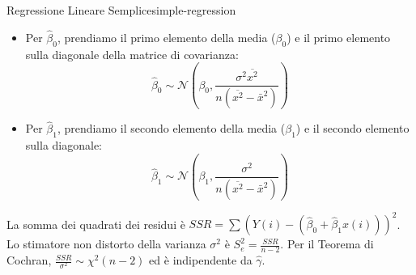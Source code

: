 \begin{esempio}{Regressione Lineare Semplice}{simple-regression}
\begin{itemize}
    \item Per $\hat{\beta}_0$, prendiamo il primo elemento della media ($\beta_0$) e il primo elemento sulla diagonale della matrice di covarianza:
    \[
    \hat{\beta}_0 \sim \mathcal{N}\left(\beta_0, \frac{\sigma^2\overline{x^2}}{n(\overline{x^2}-\bar{x}^2)}\right)
    \]
    \item Per $\hat{\beta}_1$, prendiamo il secondo elemento della media ($\beta_1$) e il secondo elemento sulla diagonale:
    \[
    \hat{\beta}_1 \sim \mathcal{N}\left(\beta_1, \frac{\sigma^2}{n(\overline{x^2}-\bar{x}^2)}\right)
    \]
\end{itemize}
La somma dei quadrati dei residui è $SSR = \sum(Y(i) - (\hat{\beta}_0 +
\hat{\beta}_1 x(i)))^2$. Lo stimatore non distorto della varianza $\sigma^2$ è
$S_e^2 = \frac{SSR}{n-2}$\label{eq:se-lin-regr}. Per il Teorema di Cochran, $\frac{SSR}{\sigma^2} \sim
\chi^2(n-2)$ ed è indipendente da $\hat{\gamma}$.
\end{esempio}
